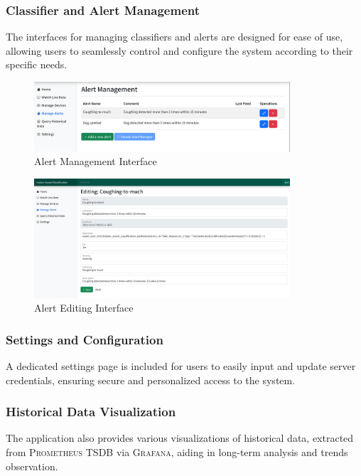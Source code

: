 \subsubsection{Classifier and Alert Management}
The interfaces for managing classifiers and alerts are designed for ease of use, allowing users to seamlessly control and configure the system according to their specific needs.

\begin{figure}[htbp]
  \centering
  \includegraphics[width=0.85\textwidth]{Pictures/alertmanagement}
  \caption{\label{fig:alertmanagement}Alert Management Interface}
\end{figure}

\begin{figure}[htbp]
  \centering
  \includegraphics[width=0.85\textwidth]{Pictures/alertedit}
  \caption{\label{fig:alertedit}Alert Editing Interface}
\end{figure}

\subsubsection{Settings and Configuration}
A dedicated settings page is included for users to easily input and update server credentials, ensuring secure and personalized access to the system.

\subsubsection{Historical Data Visualization}
The application also provides various visualizations of historical data, extracted from \textsc{Prometheus} TSDB via \textsc{Grafana}, aiding in long-term analysis and trends observation.

